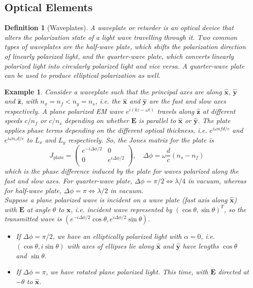 \documentclass[a4paper]{article}
\newtheorem{eg}{Example}[section]
\theoremstyle{new}
\newtheorem{defi}{Definition}[section]
\begin{document}
\subsection{Optical Elements}
\begin{defi}[Waveplates]
A waveplate or retarder is an optical device that alters the polarization state of a light wave travelling through it. Two common types of waveplates are the half-wave plate, which shifts the polarization direction of linearly polarized light, and the quarter-wave plate, which converts linearly polarized light into circularly polarized light and vice versa. A quarter-wave plate can be used to produce elliptical polarization as well.
\end{defi}
\begin{eg}
Consider a waveplate such that the principal axes are along $\mathbf{\hat{x}}$, $\mathbf{\hat{y}}$ and $\mathbf{\hat{z}}$, with $n_x=n_f<n_y=n_s$, i.e. the $\mathbf{\hat{x}}$ and $\mathbf{\hat{y}}$ are the fast and slow axes respectively. A plane polarized EM wave $e^{i(kz-\omega t)}$ travels along $\mathbf{\hat{z}}$ at different speeds $c/n_f$ or $c/n_s$ depending on whether $\mathbf{E}$ is parallel to $\mathbf{\hat{x}}$ or $\mathbf{\hat{y}}$. The plate applies phase terms depending on the different optical thickness, i.e. $e^{i\omega nfd/c}$ and $e^{i\omega n_sd/c}$ to $L_x$ and $L_y$ respectively. So, the Jones matrix for the plate is
$$J_{\text{plate}}=\begin{pmatrix}e^{-i\Delta\phi/2}&0\\0&e^{i\Delta\phi/2}\\\end{pmatrix},\quad\Delta\phi=\omega\frac{d}{c}(n_s-n_f)$$
which is the phase difference induced by the plate for waves polarized along the fast and slow axes. For quarter-wave plate, $\Delta\phi=\pi/2\iff\lambda/4$ in vacuum, whereas for half-wave plate, $\Delta\phi=\pi\iff\lambda/2$ in vacuum.\\[5pt]
Suppose a plane polarized wave is incident on a wave plate (fast axis along $\mathbf{\hat{x}}$) with $\mathbf{E}$ at angle $\theta$ to $\mathbf{\hat{x}}$, i.e. incident wave represented by $(\cos\theta,\sin\theta)^T$, so the transmitted wave is $(e^{-i\Delta\phi/2}\cos\theta,e^{i\Delta\phi/2}\sin\theta)$. 
\begin{itemize}
    \item If $\Delta\phi=\pi/2$, we have an elliptically polarized light with $\alpha=0$, i.e. $(\cos\theta,i\sin\theta)$ with axes of ellipses lie along $\mathbf{\hat{x}}$ and $\mathbf{\hat{y}}$ have lengths $\cos\theta$ and $\sin\theta$. 
    \item If $\Delta\phi=\pi$, we have rotated plane polarized light. This time, with $\mathbf{E}$ directed at $-\theta$ to $\mathbf{\hat{x}}$.
\end{itemize}
\end{eg}
\end{document}
